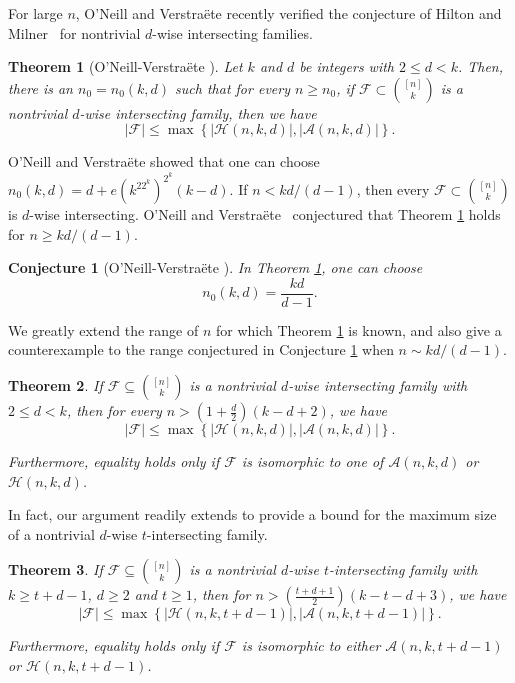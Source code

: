 \documentclass[12pt]{article}
\newtheorem{theorem}{Theorem}
\newtheorem{conjecture}{Conjecture}
\theoremstyle{definition}
\newcommand{\cH}{\mathcal{H}}
\newcommand{\cA}{\mathcal{A}}
\newcommand{\cF}{\mathcal{F}}
\begin{document}
For large $n$, O'Neill and Verstra\"{e}te \cite{OV} recently verified the conjecture of Hilton and Milner~\cite{HM} for nontrivial $d$-wise intersecting families. 

\begin{theorem}[O'Neill-Verstra\"{e}te \cite{OV}]\label{thm:ov}Let $k$ and $d$ be integers with $2\le d < k$. Then, there is an $n_0 = n_0(k, d)$ such that for every $n\ge n_0$, if $\cF \subset \binom{[n]}{k}$ is a nontrivial $d$-wise intersecting family, then we have
\[|\cF|\le \max\left\{|\cH(n, k, d)|, |\cA(n, k,d)|\right\}.\]
\end{theorem}

O'Neill and Verstra\"{e}te \cite{OV} showed that one can choose $n_0(k, d) = d+e(k^22^k)^{2^k}(k-d)$. If $n < kd/(d-1)$, then every $\cF \subset \binom{[n]}{k}$ is $d$-wise intersecting. O'Neill and Verstra\"{e}te~\cite{OV} conjectured that Theorem \ref{thm:ov} holds for $n \ge kd/(d-1)$. 

\begin{conjecture}[O'Neill-Verstra\"{e}te \cite{OV}]\label{conj:ov} In Theorem \ref{thm:ov}, one can choose \[n_0(k, d) = \frac{kd}{d-1}.\]
\end{conjecture}

We greatly extend the range of $n$ for which Theorem \ref{thm:ov} is known, and also give a counterexample to the range conjectured in Conjecture \ref{conj:ov} when $n \sim kd/(d-1)$.

\begin{theorem}\label{thm:dwiseintthm}
If $\cF \subseteq \binom{[n]}{k}$ is a nontrivial $d$-wise intersecting family with $2\le d < k$, then for every $n > \left(1+\frac{d}{2}\right)(k-d+2)$, we have
\[|\cF| \le \max\left\{|\cH(n, k, d)|, |\cA(n, k, d)|\right\}.\]

Furthermore, equality holds only if $\cF$ is isomorphic to one of $\cA(n, k, d)$ or $\cH(n, k, d)$. 
\end{theorem}

In fact, our argument readily extends to provide a bound for the maximum size of a nontrivial $d$-wise $t$-intersecting family. 

\begin{theorem}\label{thm:dwisetintthm}
If $\cF\subseteq \binom{[n]}{k}$ is a nontrivial $d$-wise $t$-intersecting family with $k\ge t+d-1$, $d\ge 2$ and $t\ge 1$, then for $n > \left(\frac{t+d+1}{2}\right)(k-t-d+3)$, we have
\[|\cF| \le \max\left\{|\cH(n, k, t+d-1)|, |\cA(n, k, t+d-1)|\right\}.\]

Furthermore, equality holds only if $\cF$ is isomorphic to either $\cA(n, k, t+d-1)$ or $\cH(n, k, t+d-1)$. 
\end{theorem}
\end{document}
